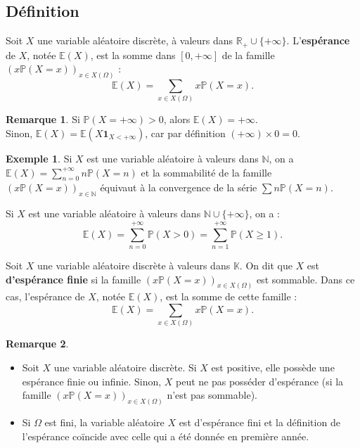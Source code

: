 \documentclass[french]{article}
\renewcommand{\P}{\mathbb{P}}
\newcommand{\N}{\mathbb{N}}
\newcommand{\R}{\mathbb{R}}
\newcommand{\K}{\mathbb{K}}
\newcommand{\E}{\mathbb{E}}
\theoremstyle{plain}
\theoremstyle{definition}
\newtheorem*{ex}{Exemple}
\newtheorem*{rmq}{Remarque}
\theoremstyle{remark}
\begin{document}
\subsection{Définition}

\begin{dfn}
	Soit $X$ une variable aléatoire discrète, à valeurs dans $\R_+\cup\{+\infty\}$. L'\textbf{espérance} de $X$, notée $\E(X)$, est la somme dans $[0,+\infty]$ de la famille $(x\P(X=x))_{x\in X(\Omega)}$ : $$\E(X)=\sum_{x\in X(\Omega)}x\P(X=x).$$
\end{dfn}

\begin{rmq}
	Si $\P(X=+\infty)>0$, alors $\E(X)=+\infty$. \\
	Sinon, $\E(X)=\E(X\textbf{1}_{X<+\infty})$, car par définition $(+\infty)\times 0=0$.
\end{rmq}

\begin{ex}
	Si $X$ est une variable aléatoire à valeurs dans $\N$, on a $\E(X)=\displaystyle\sum_{n=0}^{+\infty}n\P(X=n)$ et la sommabilité de la famille $(x\P(X=x))_{x\in\N}$ équivaut à la convergence de la série $\displaystyle\sum n\P(X=n)$.
\end{ex}

\begin{thm}{}%
	Si $X$ est une variable aléatoire à valeurs dans $\N\cup\{+\infty\}$, on a :
	$$\E(X)=\sum_{n=0}^{+\infty}\P(X>0)=\sum_{n=1}^{+\infty}\P(X\geqslant 1).$$
\end{thm}

\begin{dfn}
	Soit $X$ une variable aléatoire discrète à valeurs dans $\K$. On dit que $X$ est \textbf{d'espérance finie} si la famille $(x\P(X=x))_{x\in X(\Omega)}$ est sommable. Dans ce cas, l'espérance de $X$, notée $\E(X)$, est la somme de cette famille :
	$$\E(X)=\sum_{x\in X(\Omega)}x\P(X=x).$$
\end{dfn}

\begin{rmq}
	\begin{itemize}
		\item Soit $X$ une variable aléatoire discrète. Si $X$ est positive, elle possède une espérance finie ou infinie. Sinon, $X$ peut ne pas posséder d'espérance (si la famille $(x\P(X=x))_{x\in X(\Omega)}$ n'est pas sommable).
		\item Si $\Omega$ est fini, la variable aléatoire $X$ est d'espérance fini et la définition de l'espérance coïncide avec celle qui a été donnée en première année.
	\end{itemize}
\end{rmq}
\end{document}
